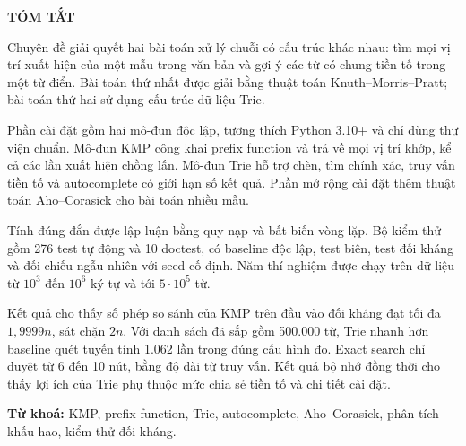 \newpage
\thispagestyle{plain}

\begin{center}
    {\bfseries\Large TÓM TẮT}
\end{center}

\vspace{1cm}

Chuyên đề giải quyết hai bài toán xử lý chuỗi có cấu trúc khác nhau: tìm mọi vị trí xuất hiện
của một mẫu trong văn bản và gợi ý các từ có chung tiền tố trong một từ điển. Bài toán thứ nhất
được giải bằng thuật toán Knuth--Morris--Pratt; bài toán thứ hai sử dụng cấu trúc dữ liệu Trie.

Phần cài đặt gồm hai mô-đun độc lập, tương thích Python 3.10+ và chỉ dùng thư viện chuẩn.
Mô-đun KMP công khai prefix function và trả về mọi vị trí khớp, kể cả các lần xuất hiện chồng
lấn. Mô-đun Trie hỗ trợ chèn, tìm chính xác, truy vấn tiền tố và autocomplete có giới hạn số
kết quả. Phần mở rộng cài đặt thêm thuật toán Aho--Corasick cho bài toán nhiều mẫu.

Tính đúng đắn được lập luận bằng quy nạp và bất biến vòng lặp. Bộ kiểm thử gồm 276 test tự động
và 10 doctest, có baseline độc lập, test biên, test đối kháng và đối chiếu ngẫu nhiên với seed
cố định. Năm thí nghiệm được chạy trên dữ liệu từ \(10^3\) đến \(10^6\) ký tự và tới
\(5\cdot10^5\) từ.

Kết quả cho thấy số phép so sánh của KMP trên đầu vào đối kháng đạt tối đa \(1{,}9999n\), sát
chặn \(2n\). Với danh sách đã sắp gồm 500.000 từ, Trie nhanh hơn baseline quét tuyến tính
1.062 lần trong đúng cấu hình đo. Exact search chỉ duyệt từ 6 đến 10 nút, bằng độ dài từ truy
vấn. Kết quả bộ nhớ đồng thời cho thấy lợi ích của Trie phụ thuộc mức chia sẻ tiền tố và chi
tiết cài đặt.

\vspace{0.5cm}
\noindent\textbf{Từ khoá:} KMP, prefix function, Trie, autocomplete, Aho--Corasick,
phân tích khấu hao, kiểm thử đối kháng.
